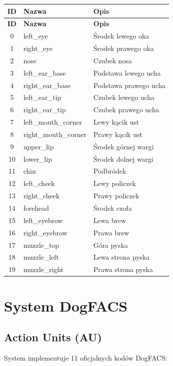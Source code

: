 \documentclass[12pt,a4paper]{article}
\begin{document}
\begin{longtable}{|c|l|l|}
\hline
\textbf{ID} & \textbf{Nazwa} & \textbf{Opis} \\
\hline
\endfirsthead
\hline
\textbf{ID} & \textbf{Nazwa} & \textbf{Opis} \\
\hline
\endhead
0 & left\_eye & Środek lewego oka \\
1 & right\_eye & Środek prawego oka \\
2 & nose & Czubek nosa \\
3 & left\_ear\_base & Podstawa lewego ucha \\
4 & right\_ear\_base & Podstawa prawego ucha \\
5 & left\_ear\_tip & Czubek lewego ucha \\
6 & right\_ear\_tip & Czubek prawego ucha \\
7 & left\_mouth\_corner & Lewy kącik ust \\
8 & right\_mouth\_corner & Prawy kącik ust \\
9 & upper\_lip & Środek górnej wargi \\
10 & lower\_lip & Środek dolnej wargi \\
11 & chin & Podbródek \\
12 & left\_cheek & Lewy policzek \\
13 & right\_cheek & Prawy policzek \\
14 & forehead & Środek czoła \\
15 & left\_eyebrow & Lewa brew \\
16 & right\_eyebrow & Prawa brew \\
17 & muzzle\_top & Góra pyska \\
18 & muzzle\_left & Lewa strona pyska \\
19 & muzzle\_right & Prawa strona pyska \\
\hline
\end{longtable}

\section{System DogFACS}

\subsection{Action Units (AU)}

System implementuje 11 oficjalnych kodów DogFACS:
\end{document}
